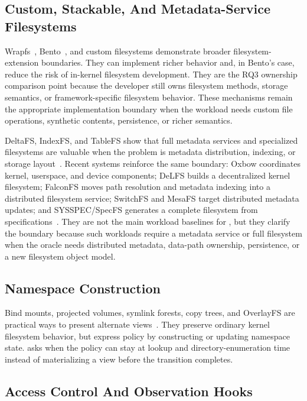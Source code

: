 \subsection{Custom, Stackable, And Metadata-Service Filesystems}

Wrapfs~\cite{wrapfs}, Bento~\cite{bento}, and custom filesystems demonstrate
broader filesystem-extension boundaries. They can implement richer behavior and,
in Bento's case, reduce the risk of in-kernel filesystem development. They are
the RQ3 ownership comparison point because the developer still owns filesystem
methods, storage semantics, or framework-specific filesystem behavior. These
mechanisms remain the appropriate implementation boundary when the workload
needs custom file operations, synthetic contents, persistence, or richer
semantics.

DeltaFS, IndexFS, and TableFS show that full metadata services and specialized
filesystems are valuable when the problem is metadata distribution, indexing,
or storage layout~\cite{deltafs_sc21,indexfs,tablefs}. Recent systems reinforce
the same boundary: Oxbow coordinates kernel, userspace, and device components;
DeLFS builds a decentralized kernel filesystem; FalconFS moves path resolution
and metadata indexing into a distributed filesystem service; SwitchFS and
MesaFS target distributed metadata updates; and SYSSPEC/SpecFS generates a
complete filesystem from specifications~\cite{oxbow_osdi26,delfs_osdi26,falconfs_nsdi26,switchfs_eurosys26,mesafs_eurosys26,specfs_fast26}.
They are not the main workload baselines for \namei, but they clarify the
boundary because such workloads require a metadata service or full filesystem
when the oracle needs distributed metadata, data-path ownership, persistence,
or a new filesystem object model.

\subsection{Namespace Construction}

Bind mounts, projected volumes, symlink forests, copy trees, and OverlayFS are
practical ways to present alternate views~\cite{kubernetes_projected_volumes,linux_overlayfs}.
They preserve ordinary kernel filesystem behavior, but express policy by
constructing or updating namespace state. \namei asks when the policy can stay
at lookup and directory-enumeration time instead of materializing a view before
the transition completes.

\subsection{Access Control And Observation Hooks}

